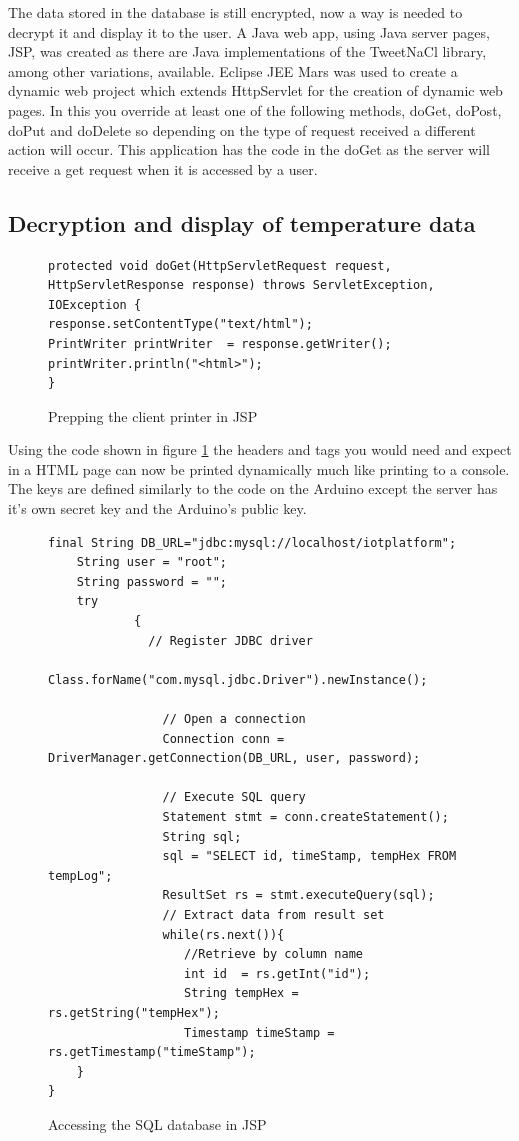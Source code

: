 The data stored in the database is still encrypted, now a way is needed to decrypt it and display it to the user. A Java web app, using Java server pages, JSP, was created as there are Java implementations of the TweetNaCl library, among other variations, available\cite{ian}. Eclipse JEE Mars was used to create a dynamic web project which extends HttpServlet for the creation of dynamic web pages. In this you override at least one of the following methods, doGet, doPost, doPut and doDelete so depending on the type of request received a different action will occur. This application has the code in the doGet as the server will receive a get request when it is accessed by a user.

\subsection{Decryption and display of temperature data}

\begin{figure}[H]
\begin{lstlisting}[style=Java]
protected void doGet(HttpServletRequest request, HttpServletResponse response) throws ServletException, IOException {
response.setContentType("text/html");
PrintWriter printWriter  = response.getWriter();
printWriter.println("<html>");
}
\end{lstlisting}
\caption{Prepping the client printer in JSP}
\label{snip:clientprinterjsp}
\end{figure}

Using the code shown in figure \ref{snip:clientprinterjsp} the headers and tags you would need and expect in a HTML page can now be printed dynamically much like printing to a console. The keys are defined similarly to the code on the Arduino except the server has it's own secret key and the Arduino's public key.

\begin{figure}[H]
\begin{lstlisting}[style=Java]
	final String DB_URL="jdbc:mysql://localhost/iotplatform";
	String user = "root"; 
	String password = "";
	try
	        {
	          // Register JDBC driver
	          Class.forName("com.mysql.jdbc.Driver").newInstance();

	            // Open a connection
	            Connection conn = DriverManager.getConnection(DB_URL, user, password);

	            // Execute SQL query
	            Statement stmt = conn.createStatement();
	            String sql;
	            sql = "SELECT id, timeStamp, tempHex FROM tempLog";
	            ResultSet rs = stmt.executeQuery(sql);
	            // Extract data from result set
	            while(rs.next()){
	               //Retrieve by column name
	               int id  = rs.getInt("id");
	               String tempHex = rs.getString("tempHex");
	               Timestamp timeStamp = rs.getTimestamp("timeStamp");
	}
}
\end{lstlisting}
\caption{Accessing the SQL database in JSP}
\label{snip:jspcode}
\end{figure}

